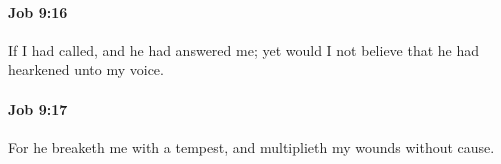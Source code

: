 		\paragraph{Job 9:16} %
			\label{JOB-9-16}

			If I had called, and he had answered me; yet would I not believe that he had hearkened unto my voice.


		\paragraph{Job 9:17} %
			\label{JOB-9-17}

			For he breaketh me with a tempest, and multiplieth my wounds without cause.


